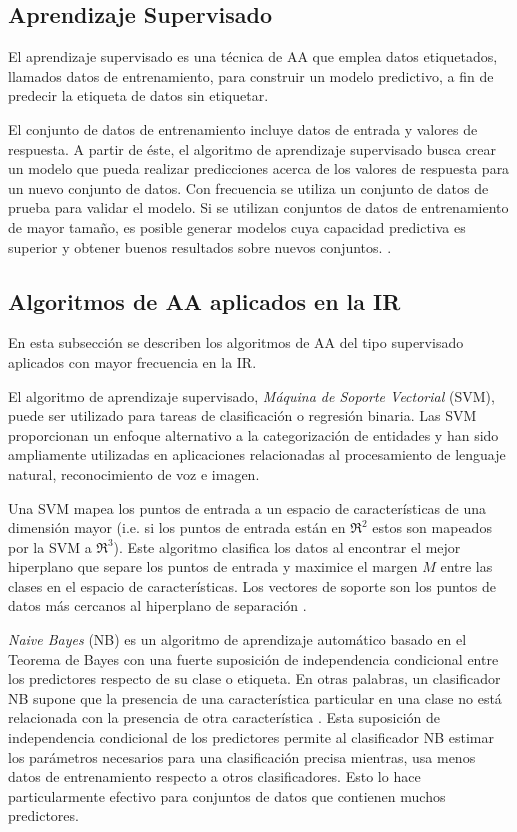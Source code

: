 \documentclass[journal]{IEEEtran}
\begin{document}
\subsection{Aprendizaje Supervisado}

El aprendizaje supervisado es una técnica de AA que emplea datos etiquetados, llamados datos de entrenamiento, para construir un modelo predictivo, a fin de predecir la etiqueta de datos sin etiquetar.

El conjunto de datos de entrenamiento incluye datos de entrada y valores de respuesta. A partir de éste, el algoritmo de aprendizaje supervisado busca crear un modelo que pueda realizar predicciones acerca de los valores de respuesta para un nuevo conjunto de datos. Con frecuencia se utiliza un conjunto de datos de prueba para validar el modelo. Si se utilizan conjuntos de datos de entrenamiento de mayor tamaño, es posible generar modelos cuya capacidad predictiva es superior y obtener buenos resultados sobre nuevos conjuntos. \cite{Darnstadt2014}.

\subsection{Algoritmos de AA aplicados en la IR}

En esta subsección se describen los algoritmos de AA del tipo supervisado aplicados con mayor frecuencia en la IR. 

El algoritmo de aprendizaje supervisado, \textit{Máquina de Soporte Vectorial} (SVM), puede ser utilizado para tareas de clasificación o regresión binaria. Las SVM proporcionan un enfoque alternativo a la categorización de entidades y han sido ampliamente utilizadas en aplicaciones relacionadas al procesamiento de lenguaje natural, reconocimiento de voz e imagen.

Una SVM mapea los puntos de entrada a un espacio de características de una dimensión mayor (i.e. si los puntos de entrada están en \(ℜ^2\) estos son mapeados por la SVM a \(ℜ^3\)). Este algoritmo clasifica los datos al encontrar el mejor hiperplano que separe los puntos de entrada y maximice el margen \( M \) entre las clases en el espacio de características.  Los vectores de soporte son los puntos de datos más cercanos al hiperplano de separación \cite{shawe2000support}.

\textit{Naive Bayes} (NB) es un algoritmo de aprendizaje automático basado en el Teorema de Bayes con una fuerte suposición de independencia condicional entre los predictores respecto de su clase o etiqueta. En otras palabras, un clasificador NB supone que la presencia de una característica particular en una clase no está relacionada con la presencia de otra característica \cite{manning2010introduction}. Esta suposición de independencia condicional de los predictores permite al clasificador NB estimar los parámetros necesarios para una clasificación precisa mientras, usa menos datos de entrenamiento respecto a otros clasificadores. Esto lo hace particularmente efectivo para conjuntos de datos que contienen muchos predictores. 
\end{document}
